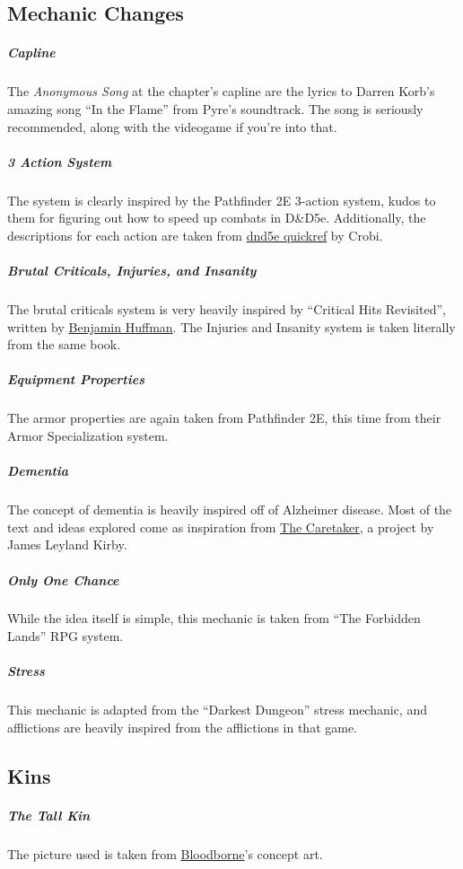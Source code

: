 
\subsection*{Mechanic Changes}
    \subparagraph{Capline} The \textit{Anonymous Song} at the chapter's capline are the lyrics to Darren Korb's amazing song ``In the Flame'' from Pyre's soundtrack.
    The song is seriously recommended, along with the videogame if you're into that.

    \subparagraph{3 Action System} The system is clearly inspired by the Pathfinder 2E 3-action system, kudos to them for figuring out how to speed up combats in D\&D5e.
    Additionally, the descriptions for each action are taken from \href{https://crobi.github.io/dnd5e-quickref/}{dnd5e quickref} by Crobi.

    \subparagraph{Brutal Criticals, Injuries, and Insanity} The brutal criticals system is very heavily inspired by ``Critical Hits Revisited'', written by \href{https://www.sterlingvermin.com/}{Benjamin Huffman}.
    The Injuries and Insanity system is taken literally from the same book.

    \subparagraph{Equipment Properties} The armor properties are again taken from Pathfinder 2E, this time from their Armor Specialization system.

    \subparagraph{Dementia} The concept of dementia is heavily inspired off of Alzheimer disease.
    Most of the text and ideas explored come as inspiration from \href{https://thecaretaker.bandcamp.com/}{The Caretaker}, a project by James Leyland Kirby.

    \subparagraph{Only One Chance} While the idea itself is simple, this mechanic is taken from ``The Forbidden Lands'' RPG system.

    \subparagraph{Stress} This mechanic is adapted from the ``Darkest Dungeon'' stress mechanic, and afflictions are heavily inspired from the afflictions in that game.

\subsection*{Kins}
    \subparagraph{The Tall Kin} The picture used is taken from \href{https://www.playstation.com/en-us/games/bloodborne-ps4/}{Bloodborne}'s concept art.

